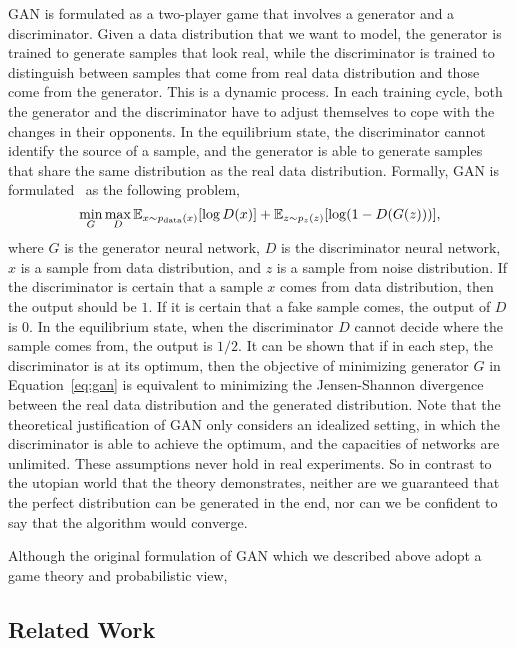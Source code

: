 GAN is formulated as a two-player game that involves a generator and
a discriminator.
Given a data distribution that we want to model,
the generator is trained to generate samples that look real,
while the discriminator is trained to distinguish between
samples that come from real data distribution and
those come from the generator.
This is a dynamic process.
In each training cycle,
both the generator and the discriminator have to adjust themselves
to cope with the changes in their opponents.
In the equilibrium state,
the discriminator cannot identify the source of a sample,
and the generator is able to generate samples that share the same
distribution as the real data distribution.
Formally,
GAN is formulated~\cite{goodfellow2014generative} as the following problem,
\begin{equation}\label{eq:gan}
    \min_G \max_D {\mathbb{E}}_{x\sim p_{\text{data}}(x)}[\log D(x)]
        + {\mathbb{E}}_{z\sim p_z(z)}[\log (1-D(G(z)))],
\end{equation}
where $G$ is the generator neural network,
$D$ is the discriminator neural network,
$x$ is a sample from data distribution,
and $z$ is a sample from noise distribution.
If the discriminator is certain that a sample $x$ comes from
data distribution,
then the output should be $1$.
If it is certain that a fake sample comes,
the output of $D$ is $0$.
In the equilibrium state,
when the discriminator $D$ cannot decide where the sample comes from,
the output is $1/2$.
It can be shown that if in each step,
the discriminator is at its optimum,
then the objective of minimizing generator $G$ in Equation~\eqref{eq:gan}
is equivalent to minimizing the Jensen-Shannon divergence between
the real data distribution and the generated distribution.
Note that the theoretical justification of GAN
only considers an idealized setting,
in which the discriminator is able to achieve the optimum,
and the capacities of networks are unlimited.
These assumptions never hold in real experiments.
So in contrast to the utopian world that the theory demonstrates,
neither are we guaranteed that the perfect distribution
can be generated in the end,
nor can we be confident to say that the algorithm would converge.

Although the original formulation of GAN which
we described above adopt a game theory and probabilistic view,

\subsection{Related Work}
